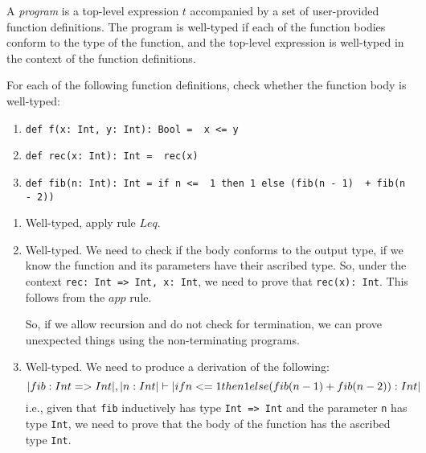 
\begin{exercise}{}

  A \emph{program} is a top-level expression \(t\) accompanied by a set of
  user-provided function definitions. The program is well-typed if each of the
  function bodies conform to the type of the function, and the top-level
  expression is well-typed in the context of the function definitions.

  For each of the following function definitions, check whether the function
  body is well-typed:
  \begin{enumerate}
    \item \lstinline|def f(x: Int, y: Int): Bool =  x <= y|
    \item \lstinline|def rec(x: Int): Int =  rec(x)|
    \item \lstinline|def fib(n: Int): Int = if n <=  1 then 1 else (fib(n - 1)  + fib(n - 2))|
  \end{enumerate}

  \begin{solution}
    \begin{enumerate}
      \item Well-typed, apply rule \(Leq\).
      \item Well-typed. We need to check if the body conforms to the output
      type, if we know the function and its parameters have their ascribed type.
      So, under the context \lstinline|rec: Int => Int, x: Int|, we need to
      prove that \lstinline|rec(x): Int|. This follows from the \(app\) rule.

      So, if we allow recursion and do not check for termination, we can prove
      unexpected things using the non-terminating programs.
      \item Well-typed. We need to produce a derivation of the following:
      \begin{equation*}
        \lstinline|fib: Int => Int|, \lstinline|n: Int| \vdash \lstinline|if n <=  1 then 1 else (fib(n - 1)  + fib(n - 2)): Int|
      \end{equation*} 
      i.e., given that \lstinline|fib| inductively has type \lstinline|Int => Int| and
      the parameter \lstinline|n| has type \lstinline|Int|, we need to prove that the
      body of the function has the ascribed type \lstinline|Int|.
       

\end{enumerate}
\end{solution}
\end{exercise}

